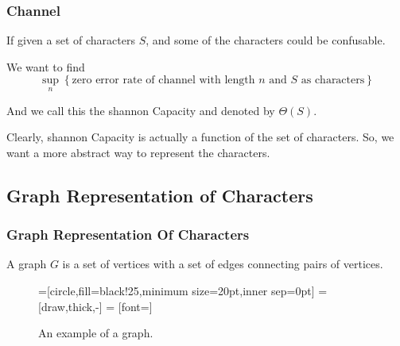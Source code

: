       \begin{frame}
            \frametitle{Channel}
            If given a set of characters $S$, and some of the characters could be confusable.

            We want to find
            \begin{equation}
                  \sup_{n} \left\{
                        \text{zero error rate of channel with length $n$ and $S$ as characters}
                  \right\}
            \end{equation}

            And we call this the shannon Capacity and denoted by $\Theta(S)$.

            Clearly, shannon Capacity is actually a function of the set of characters. So, we want a more abstract way to represent the characters.
      \end{frame}

\subsection{Graph Representation of Characters}

      \begin{frame}
            \frametitle{Graph Representation Of Characters}
            \begin{definition}[graph] \label{def:graph}
                  A graph $ G $ is a set of vertices with a set of edges connecting pairs of vertices.

                  \begin{figure}[h!]
                        =[circle,fill=black!25,minimum size=20pt,inner sep=0pt]
                         = [draw,thick,-]
                         = [font=\small]
                        \label{fig:graphDefinitionExample}
                        \caption{An example of a graph.}
                  \end{figure}
            \end{definition}
      \end{frame}

